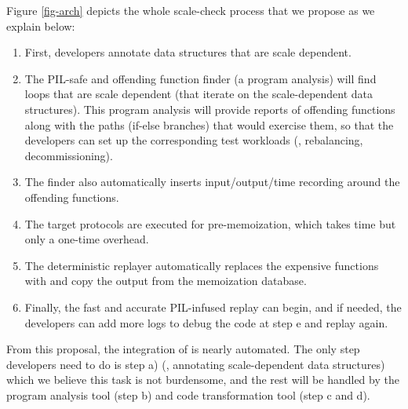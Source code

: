 

Figure \ref{fig-arch} depicts the whole scale-check process that we propose as
we explain below:
%
\begin{enumerate}[label=(\alph*)]

\item First, developers annotate data structures that are scale dependent.
%
\item The PIL-safe and offending function finder (a program analysis) will find
loops that are scale dependent (that iterate on the scale-dependent data
structures). This program analysis will provide reports of offending functions
along with the paths (if-else branches) that would exercise them, so that the
developers can set up the corresponding test workloads (\eg, rebalancing,
decommissioning).
%
\item The finder also automatically inserts input/output/time recording around
the offending functions.
%
\item The target protocols are executed for pre-memoization, which takes time
but only a one-time overhead.
%
\item The deterministic replayer automatically replaces the expensive functions
with  and copy the output from the memoization database.
%
\item Finally, the fast and accurate PIL-infused replay can begin, and if
needed, the developers can add more logs to debug the code at step e and replay
again.

\end{enumerate}

From this proposal, the integration of \sck is nearly automated. The only step
developers need to do is step a) (\ie, annotating scale-dependent data
structures) which we believe this task is not burdensome, and the rest will be
handled by the program analysis tool (step b) and code transformation tool (step
c and d).
